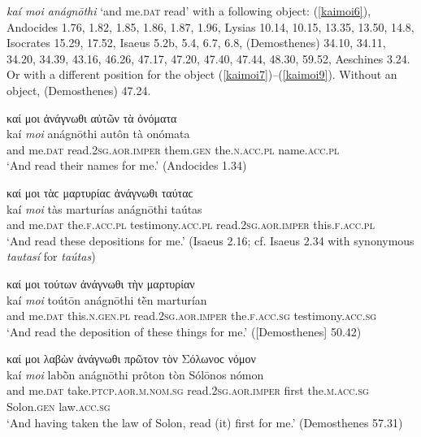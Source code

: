 \textit{kaí moi anágnōthi} `and me.\textsc{dat} read' with a following object: (\ref{kaimoi6}), Andocides 1.76, 1.82, 1.85, 1.86, 1.87, 1.96, Lysias 10.14, 10.15, 13.35, 13.50, 14.8, Isocrates 15.29, 17.52, Isaeus 5.2b, 5.4, 6.7, 6.8, (Demosthenes) 34.10, 34.11, 34.20, 34.39, 43.16, 46.26, 47.17, 47.20, 47.40, 47.44, 48.30, 59.52, Aeschines 3.24. Or with a different position for the object (\ref{kaimoi7})--(\ref{kaimoi9}). Without an object, (Demosthenes) 47.24.

\begin{exe}
\ex καί μοι ἀνάγνωθι αὐτῶν τὰ ὀνόματα\\
\gll kaí \emph{moi} anágnōthi autôn tà onómata\\
and me.\textsc{dat} read.\textsc{2sg.aor.imper} them.\textsc{gen}
the.\textsc{n.acc.pl} name.\textsc{acc.pl}\\
\trans `And read their names for me.' (Andocides 1.34)
\label{kaimoi6}
\end{exe}

\begin{exe}
\ex καί μοι τὰϲ μαρτυρίαϲ ἀνάγνωθι ταύταϲ\\
\gll kaí \emph{moi} tàs marturías anágnōthi taútas\\
and me.\textsc{dat} the.\textsc{f.acc.pl} testimony.\textsc{acc.pl}
read.\textsc{2sg.aor.imper} this.\textsc{f.acc.pl}\\
\trans `And read these depositions for me.' (Isaeus 2.16; cf. Isaeus 2.34 with synonymous \emph{tautasí} for \textit{taútas})
\label{kaimoi7}
\end{exe}

\begin{exe}
\ex καί μοι τούτων ἀνάγνωθι τὴν μαρτυρίαν\\
\gll kaí \emph{moi} toútōn anágnōthi tḕn marturían\\
and me.\textsc{dat} this.\textsc{n.gen.pl} read.\textsc{2sg.aor.imper}
the.\textsc{f.acc.sg} testimony.\textsc{acc.sg}\\
\trans `And read the deposition of these things for me.' ({[}Demosthenes{]} 50.42)
\label{kaimoi8}
\end{exe}

\begin{exe}
\ex καί μοι λαβὼν ἀνάγνωθι πρῶτον τὸν Σόλωνοϲ νόμον\\
\gll kaí \emph{moi} labṑn anágnōthi prôton tòn Sólōnos nómon\\
and me.\textsc{dat} take.\textsc{ptcp.aor.m.nom.sg}
read.\textsc{2sg.aor.imper} first the.\textsc{m.acc.sg} Solon.\textsc{gen} law.\textsc{acc.sg}\\
\trans `And having taken the law of Solon, read (it) first for me.' (Demosthenes 57.31)\\
\label{kaimoi9}
\end{exe}

